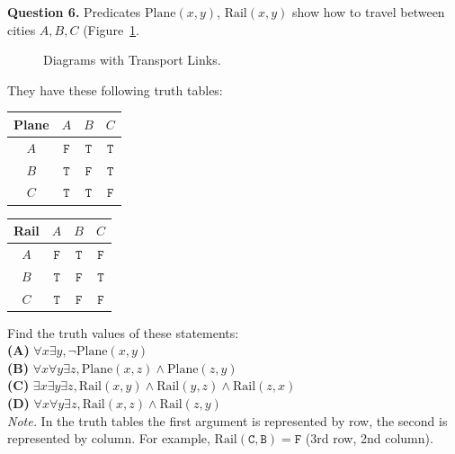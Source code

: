 \documentclass[jou]{apa6}
\begin{document}
{\bf Question 6.} Predicates $\mathrm{Plane}(x,y)$, 
$\mathrm{Rail}(x,y)$ show how to travel between cities $A,B,C$ (Figure~\ref{fig:relation-graphs-quiz2}. 


\begin{figure}[!htb]
\caption{\label{fig:relation-graphs-quiz2} Diagrams with Transport Links.}
\end{figure}

They have these following truth tables:
\begin{center}
\begin{tabular}{c|ccc}
Plane & $A$ & $B$ & $C$ \\ \hline
$A$ & $\mathtt{F}$ & $\mathtt{T}$ & $\mathtt{T}$ \\
$B$ & $\mathtt{T}$ & $\mathtt{F}$ & $\mathtt{T}$ \\
$C$ & $\mathtt{T}$ & $\mathtt{T}$ & $\mathtt{F}$
\end{tabular}
\hspace{2ex}
\begin{tabular}{c|ccc}
Rail & $A$ & $B$ & $C$ \\ \hline
$A$ & $\mathtt{F}$ & $\mathtt{T}$ & $\mathtt{F}$ \\
$B$ & $\mathtt{T}$ & $\mathtt{F}$ & $\mathtt{T}$ \\
$C$ & $\mathtt{T}$ & $\mathtt{F}$ & $\mathtt{F}$
\end{tabular}
\end{center}
Find the truth values of these statements:\\
{\bf (A)} $\forall x \exists y, \neg \mathrm{Plane}(x,y)$\\
{\bf (B)} $\forall x \forall y \exists z, \mathrm{Plane}(x,z) \wedge \mathrm{Plane}(z,y)$\\
{\bf (C)} $\exists x \exists y \exists z, \mathrm{Rail}(x,y) \wedge \mathrm{Rail}(y,z) \wedge \mathrm{Rail}(z,x)$\\
{\bf (D)} $\forall x \forall y \exists z, \mathrm{Rail}(x,z) \wedge \mathrm{Rail}(z,y)$\\
{\em Note.} In the truth tables the first argument is
represented by row, the second is represented by column. 
For example, $\mathrm{Rail}(\mathtt{C}, \mathtt{B}) = \mathtt{F}$ (3rd row,
2nd column).
\end{document}

